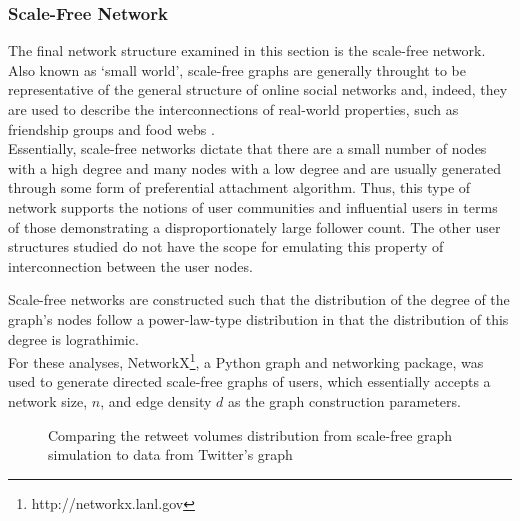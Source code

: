 \subsubsection{Scale-Free Network}
The final network structure examined in this section is the scale-free network. Also known as `small world', scale-free graphs are generally throught to be representative of the general structure of online social networks \cite{mislove07} and, indeed, they are used to describe the interconnections of real-world properties, such as friendship groups and food webs \cite{guido07} \cite{hein06}.\\
Essentially, scale-free networks dictate that there are a small number of nodes with a high degree and many nodes with a low degree and are usually generated through some form of preferential attachment algorithm. Thus, this type of network supports the notions of user communities and influential users in terms of those demonstrating a disproportionately large follower count. The other user structures studied do not have the scope for emulating this property of interconnection between the user nodes.

Scale-free networks are constructed such that the distribution of the degree of the graph's nodes follow a power-law-type distribution in that the distribution of this degree is lograthimic. \\
For these analyses, NetworkX\footnote{http://networkx.lanl.gov}, a Python graph and networking package, was used to generate directed scale-free graphs of users, which essentially accepts a network size, $n$, and edge density $d$ as the graph construction parameters. 

\begin{figure}[h]
\centering
{}
\caption{Comparing the retweet volumes distribution from scale-free graph simulation to data from Twitter's graph}
\label{fig:real-scalefree}
\end{figure}

